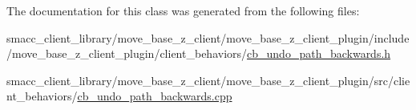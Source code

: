 The documentation for this class was generated from the following files\+:\begin{DoxyCompactItemize}
\item 
smacc\+\_\+client\+\_\+library/move\+\_\+base\+\_\+z\+\_\+client/move\+\_\+base\+\_\+z\+\_\+client\+\_\+plugin/include/move\+\_\+base\+\_\+z\+\_\+client\+\_\+plugin/client\+\_\+behaviors/\hyperlink{cb__undo__path__backwards_8h}{cb\+\_\+undo\+\_\+path\+\_\+backwards.\+h}\item 
smacc\+\_\+client\+\_\+library/move\+\_\+base\+\_\+z\+\_\+client/move\+\_\+base\+\_\+z\+\_\+client\+\_\+plugin/src/client\+\_\+behaviors/\hyperlink{cb__undo__path__backwards_8cpp}{cb\+\_\+undo\+\_\+path\+\_\+backwards.\+cpp}\end{DoxyCompactItemize}
